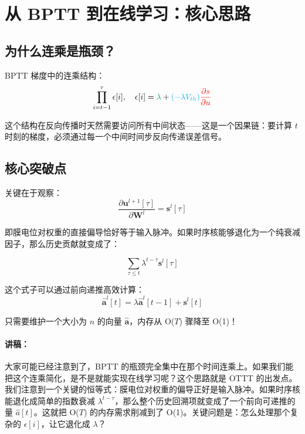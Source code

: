 \documentclass[journal,12pt,onecolumn]{IEEEtran}
\begin{document}
\section{从 BPTT 到在线学习：核心思路}

\subsection*{为什么连乘是瓶颈？}

BPTT 梯度中的连乘结构：
\begin{equation}
\prod_{i=t-1}^{\tau} \epsilon[i], \quad \epsilon[i] = {\color[rgb]{0,0.69,0.31}{\lambda}} + {\color{cyan}{(-\lambda V_{th})}}{\color{red}{\frac{\partial s}{\partial u}}}
\label{eq.epsilon}
\end{equation}

这个结构在反向传播时天然需要访问所有中间状态——这是一个因果链：要计算 $t$ 时刻的梯度，必须通过每一个中间时间步反向传递误差信号。

\subsection*{核心突破点}

关键在于观察：
\[
\frac{\partial \mathbf{u}^{l+1}[\tau]}{\partial \mathbf{W}^l} = \mathbf{s}^{l}[\tau]
\]

即膜电位对权重的直接偏导恰好等于输入脉冲。如果时序核能够退化为一个纯衰减因子，那么历史贡献就变成了：

\[
\sum_{\tau \leq t} \lambda^{t-\tau} \mathbf{s}^{l}[\tau]
\]

这个式子可以通过前向递推高效计算：
\[
\hat{\mathbf{a}}^{l}[t] = \lambda \hat{\mathbf{a}}^{l}[t-1] + \mathbf{s}^{l}[t]
\]

只需要维护一个大小为 $n$ 的向量 $\hat{\mathbf{a}}$，内存从 O($T$) 骤降至 O(1)！

\paragraph{讲稿：}
大家可能已经注意到了，BPTT 的瓶颈完全集中在那个时间连乘上。如果我们能把这个连乘简化，是不是就能实现在线学习呢？这个思路就是 OTTT 的出发点。我们注意到一个关键的恒等式：膜电位对权重的偏导正好是输入脉冲。如果时序核能退化成简单的指数衰减 $\lambda^{t-\tau}$，那么整个历史回溯项就变成了一个前向可递推的量 $\hat{a}[t]$。这就把 O($T$) 的内存需求削减到了 O(1)。关键问题是：怎么处理那个复杂的 $\epsilon[i]$，让它退化成 $\lambda$？
\end{document}
